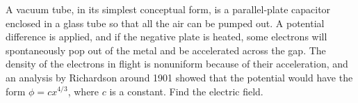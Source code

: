 A vacuum tube, in its simplest conceptual form, is a parallel-plate
capacitor enclosed in a glass tube so that all the air can be pumped
out. A potential difference is applied, and if the negative plate is
heated, some electrons will spontaneously pop out of the metal and be
accelerated across the gap. The density of the electrons in flight is
nonuniform because of their acceleration, and an analysis by
Richardson around 1901 showed that the potential would have the form
$\phi=c x^{4/3}$, where $c$ is a constant. Find the electric
field.\answercheck
%
